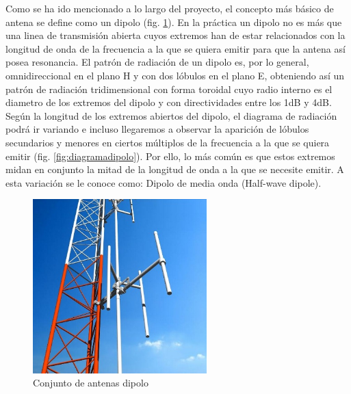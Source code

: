 \par Como se ha ido mencionado a lo largo del proyecto, el concepto más básico de antena se define como un dipolo (fig. \ref{fig:conjuntodipolo}). En la práctica un dipolo no es más que una linea de transmisión abierta cuyos extremos han de estar relacionados con la longitud de onda de la frecuencia a la que se quiera emitir para que la antena así posea resonancia. El patrón de radiación de un dipolo es, por lo general, omnidireccional en el plano H y con dos lóbulos en el plano E, obteniendo así un patrón de radiación tridimensional con forma toroidal cuyo radio interno es el diametro de los extremos del dipolo y con directividades entre los 1dB y 4dB. Según la longitud de los extremos abiertos del dipolo, el diagrama de radiación podrá ir variando e incluso llegaremos a observar la aparición de lóbulos secundarios y menores en ciertos múltiplos de la frecuencia a la que se quiera emitir (fig. \ref{fig:diagramadipolo}). Por ello, lo más común es que estos extremos midan en conjunto la mitad de la longitud de onda a la que se necesite emitir. A esta variación se le conoce como: Dipolo de media onda (Half-wave dipole).
\\
\begin{figure}[h]
    \centering
        \includegraphics[width=0.6\textwidth]{archivos/dipolo/dipoloo}
        \caption{Conjunto de antenas dipolo \citep{Ideal-Antenas2008}}
        \label{fig:conjuntodipolo}
\end{figure}

